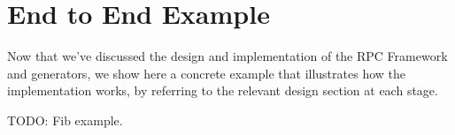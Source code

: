 \section{End to End Example} %
\label{sec:end_to_end_example}
Now that we've discussed the design and implementation of the RPC Framework and generators, we show here a concrete example that illustrates how the implementation works, by referring to the relevant design section at each stage.

TODO: Fib example.
